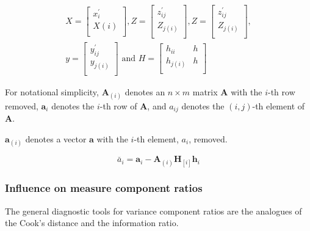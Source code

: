 \documentclass[12pt, a4paper]{report}
\theoremstyle{plain}
\theoremstyle{definition}
\theoremstyle{remark}
\begin{document}
	\begin{eqnarray*}
		X= \left[%
		\begin{array}{c}
			x^\prime_{i} \\
			X(i) \\
		\end{array}%
		\right],
		Z= \left[%
		\begin{array}{c}
			z^\prime_{ij} \\
			Z_{j(i)} \\
		\end{array}%
		\right] ,
		Z = \left[%
		\begin{array}{c}
			z^\prime_{ij} \\
			Z_{j(i)} \\
		\end{array}%
		\right], \\
		y = \left[%
		\begin{array}{c}
			y^\prime_{ij} \\
			y_{j(i)} \\
		\end{array}%
		\right]
		\mbox{ and } H = \left[%
		\begin{array}{cc}
			h_{ii}& h\\
			h_{j(i)} & h\\
		\end{array}%
		\right]
	\end{eqnarray*}
	
	For notational simplicity, $\boldsymbol{A}_{(i)}$ denotes an $n
	\times m$ matrix  $\boldsymbol{A}$ with the $i$-th row removed,
	$\boldsymbol{a}_{i}$ denotes the $i$-th row of $\boldsymbol{A}$,
	and $a_{ij}$ denotes the $(i, j)$-th element of $\boldsymbol{A}$.
	
	$\boldsymbol{a}_{(i)}$ denotes a vector $\boldsymbol{a}$ with the $i$-th element, $a_{i}$, removed.
	
	\begin{equation}
	\breve{a_{i}} =  \boldsymbol{a}_{i} -
	\boldsymbol{A}_{(i)}\boldsymbol{H}_{[i]}\boldsymbol{h}_{i}
	\end{equation}

	\subsubsection{Influence on measure component ratios}               %
	The general diagnostic tools for variance component ratios are the analogues of the Cook's distance and the information ratio.
	
\end{document}
